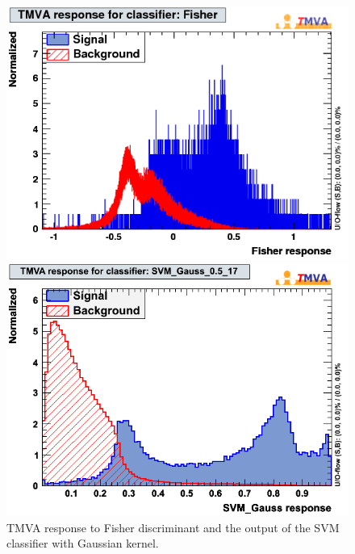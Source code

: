\documentclass[a4paper]{jpconf}
\begin{document}
\begin{figure}[h]
 \begin{minipage}{7.5cm}
\includegraphics[width=1.0\textwidth]{images/mva_Fisher.png}
\end{minipage}
 \hfill
\begin{minipage}{7.5cm}
\includegraphics[width=1.0\textwidth]{images/mk_svm_gauss2.png}



\end{minipage}
\caption{\label{fig:fishersvm}TMVA response to Fisher discriminant and 
the output of the SVM classifier with Gaussian kernel.}
\end{figure}
\end{document}
